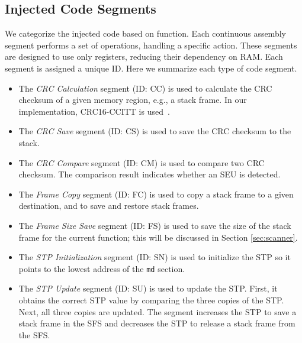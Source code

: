 \vspace{-15pt}
\subsection{Injected Code Segments}
\vspace{-5pt}

We categorize the injected code based on function. Each continuous assembly segment performs a set of operations, handling a specific action. These segments are designed to use only registers, reducing their dependency on RAM. Each segment is assigned a unique ID. Here we summarize each type of code segment.
\vspace{-5pt}
\begin{itemize}

\item The \textit{CRC Calculation} segment (ID: CC) is used to calculate the CRC checksum of a given memory region, e.g., a stack frame. In our implementation, CRC16-CCITT is used~\cite{crc16}.%
\vspace{-5pt}
\item The \textit{CRC Save} segment (ID: CS) is used to save the CRC checksum to the stack.
\vspace{-5pt}
\item The \textit{CRC Compare} segment (ID: CM) is used to compare two CRC checksum. The comparison result indicates whether an SEU is detected.
\vspace{-5pt}
\item The \textit{Frame Copy} segment (ID: FC) is used to copy a stack frame to a given destination, and to save and restore stack frames.
\vspace{-5pt}
\item The \textit{Frame Size Save} segment (ID: FS) is used to save the size of the stack frame for the current function; this will be discussed in Section \ref{sec:scanner}.
\vspace{-5pt}
\item The \textit{STP Initialization} segment (ID: SN) is used to initialize the STP so it points to the lowest address of the \texttt{md} section.
\vspace{-5pt}
\item The \textit{STP Update} segment (ID: SU) is used to update the STP. First, it obtains the correct STP value by comparing the three copies of the STP. Next, all three copies are updated. The segment increases the STP to save a stack frame in the SFS and decreases the STP to release a stack frame from the SFS.

\end{itemize}
\vspace{-25pt}
